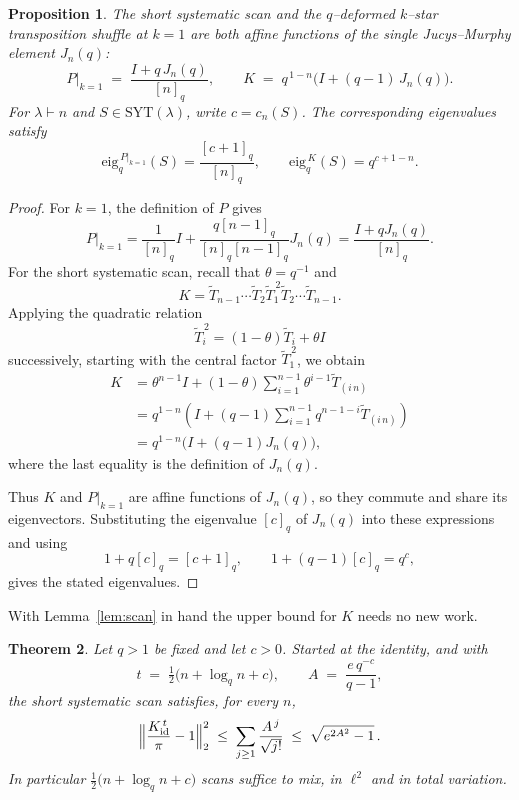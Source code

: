 \documentclass[11pt]{article}
\theoremstyle{plain}  %
\newtheorem{theorem}{Theorem}[section]
\newtheorem{proposition}[theorem]{Proposition}
\newcommand{\eig}{\text{eig}} %
\begin{document}
\begin{proposition}\label{prop:k1scan}
The short systematic scan and the $q$--deformed $k$--star transposition shuffle at $k=1$ are both affine functions
of the single Jucys--Murphy element $J_n(q)$:
\[
  P\big|_{k=1} \;=\; \frac{I + q\,J_n(q)}{[n]_q},
  \qquad
  K \;=\; q^{\,1-n}\bigl(I + (q-1)\,J_n(q)\bigr).
\]
For $\lambda\vdash n$ and $S\in\mathrm{SYT}(\lambda)$, write $c=c_n(S)$.
The corresponding eigenvalues satisfy
\[
  \eig_q^{\,P|_{k=1}}(S)=\frac{[c+1]_q}{[n]_q},
  \qquad
  \eig_q^{\,K}(S)=q^{c+1-n}.
\]
\end{proposition}

\begin{proof}
For $k=1$, the definition of $P$ gives
\[
  P\big|_{k=1}
  = \frac{1}{[n]_q}I
    + \frac{q[n-1]_q}{[n]_q[n-1]_q}J_n(q)
  = \frac{I+qJ_n(q)}{[n]_q}.
\]
For the short systematic scan, recall that $\theta=q^{-1}$ and
\[
  K=\widetilde T_{n-1}\cdots\widetilde T_2
    \widetilde T_1^{\,2}
    \widetilde T_2\cdots\widetilde T_{n-1}.
\]
Applying the quadratic relation
\[
  \widetilde T_i^{\,2}=(1-\theta)\widetilde T_i+\theta I
\]
successively, starting with the central factor $\widetilde T_1^{\,2}$,
we obtain
\[
\begin{aligned}
  K
  &= \theta^{n-1}I
     +(1-\theta)\sum_{i=1}^{n-1}
       \theta^{i-1}\widetilde T_{(i\,n)} \\
  &= q^{1-n}\left(
       I+(q-1)\sum_{i=1}^{n-1}
       q^{n-1-i}\widetilde T_{(i\,n)}
     \right) \\
  &= q^{1-n}\bigl(I+(q-1)J_n(q)\bigr),
\end{aligned}
\]
where the last equality is the definition of $J_n(q)$.

Thus $K$ and $P|_{k=1}$ are affine functions of $J_n(q)$, so they
commute and share its eigenvectors. Substituting the eigenvalue $[c]_q$
of $J_n(q)$ into these expressions and using
\[
  1+q[c]_q=[c+1]_q,
  \qquad
  1+(q-1)[c]_q=q^c,
\]
gives the stated eigenvalues.
\end{proof}





With Lemma~\ref{lem:scan} in hand the upper bound for $K$ needs no new work.

\begin{theorem}\label{thm:scan}
Let $q>1$ be fixed and let $c>0$. Started at the identity, and with
$$
  t \;=\; \tfrac12\bigl(n+\log_q n + c\bigr),
  \qquad
  A \;=\; \frac{e\,q^{-c}}{q-1},
$$
the short systematic scan satisfies, for every $n$,
$$
  \Bigl\|\frac{K^{\,t}_{\mathrm{id}}}{\pi}-1\Bigr\|_{2}^{2}
  \;\le\; \sum_{j\ge1}\frac{A^{\,j}}{\sqrt{j!}}
  \;\le\; \sqrt{e^{2A^{2}}-1}\, .
$$
In particular $\frac12\bigl(n+\log_q n+c\bigr)$ scans suffice to mix, in
$\ell^2$ and in total variation.
\end{theorem}
\end{document}
